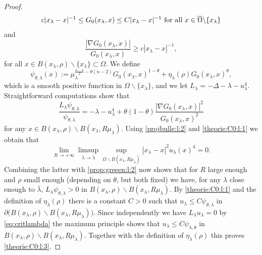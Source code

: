 \documentclass[10pt]{amsart}
\numberwithin{equation}{section}
\newcommand{\Om}{\Omega}
\def \bb{\hbox}
\def \xl{x_\lambda}
\def\la{\lambda}
\theoremstyle{plain}
\theoremstyle{remark}
\begin{document}
\begin{proof}
\begin{equation} \label{prop:greeen:l:1}  
	c  |\xl - x|^{-1} \le G_0 (\xl, x) \leq C  |\xl - x|^{-1} \bb{ for all } x\in \overline{\Om} \backslash \{\xl \}
\end{equation}
and 
\begin{equation} \label{prop:greeen:l:2} 
\frac{|\nabla G_{0}(\xl, x)|}{G_{0}(\xl, x)}\geq c |\xl - x|^{-1},
\end{equation}
for all $x\in B(\xl, \rho) \backslash \{ \xl \}\subset \Om$. We define
 \begin{equation*}
	\psi_{\theta,\la}(x):=\mu_\lambda^{\frac{n-2}{2}-\theta(n-2)}G_{0}(\xl,x)^{1-\theta}+\eta_{\la}(\rho)G_{0}(\xl, x)^{\theta},
\end{equation*}
which is a smooth positive function in $\Om \backslash \{\xl\}$, and we let $L_{\lambda}=-\Delta - \lambda -u_{\la}^{4}$. Straightforward computations show that 
$$ \frac{L_\lambda \psi_{\theta,\la}}{\psi_{\theta,\la}}  = - \lambda - u_\lambda^4 + \theta(1 - \theta)  \frac{|\nabla G_{0}(\xl, x)|^2}{G_{0}(\xl, x)^2}$$
for any $x \in B(\xl, \rho) \backslash B(\xl, R \mu_\lambda )$. Using \eqref{projbulle:l:2} and \eqref{theorie:C0:l:1} we obtain that 
$$ \lim_{R \to + \infty} \limsup_{\lambda \to \bar{\lambda}} \sup_{\Om \backslash B(\xl , R \mu_\lambda )} |\xl - x|^2 u_\lambda(x)^4 = 0. $$
Combining the latter with \eqref{prop:greeen:l:2} now shows that for $R$ large enough and $\rho$ small enough (depending on $\theta$, but both fixed) we have, for any $\lambda$ close enough to $\bar{\lambda}$, $L_\lambda \psi_{\theta,\la} >0$ in $B(\xl, \rho) \backslash B(\xl, R \mu_\lambda )$. By \eqref{theorie:C0:l:1} and the definition of $\eta_\lambda(\rho)$ there is a constant $C >0$ such that $u_\lambda \le C \psi_{\theta, \lambda}$ in $\partial \big( B(\xl, \rho) \backslash B(\xl, R \mu_\lambda )\big)$. Since independently we have $L_\lambda u_\lambda = 0$ by \eqref{eq:critlambda} the maximum principle shows that $u_\lambda \le C \psi_{\lambda, \theta}$ in $B(\xl, \rho) \backslash B(\xl, R \mu_\lambda )$. Together with the definition of $\eta_\lambda(\rho)$ this proves \eqref{theorie:C0:l:3}. 

\medskip


\end{proof}
\end{document}
